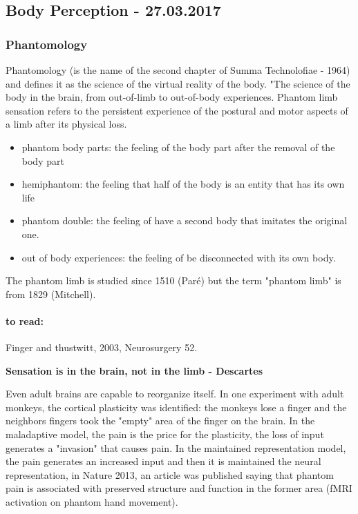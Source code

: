 \documentclass[12pt,article,oneside,a4paper]{memoir}
\begin{document}
\subsection{Body Perception - 27.03.2017}
\subsubsection{Phantomology}
Phantomology (is the name of the second chapter of Summa Technolofiae - 1964) and defines it as the science of the virtual reality of the body.
"The science of the body in the brain, from out-of-limb to out-of-body experiences. 
Phantom  limb  sensation refers to the persistent experience of the postural and motor aspects of a limb after its physical loss.
\begin{itemize}
\item phantom body parts: the feeling of the body part after the removal of the body part
\item hemiphantom: the feeling that half of the body is an entity that has its own life
\item phantom double: the feeling of have a second body that imitates the original one.
\item out of body experiences: the feeling of be disconnected with its own body.
\end{itemize}

The phantom limb is studied since 1510 (Paré) but the term "phantom limb" is from 1829 (Mitchell).

\paragraph{to read:} Finger and thustwitt, 2003, Neurosurgery 52.

\textbf{Sensation is in the brain, not in the limb - Descartes}

Even adult brains are capable to reorganize itself. In one experiment with adult monkeys, the cortical plasticity was identified: the monkeys lose a finger and the neighbors fingers took the "empty" area of the finger on the brain.
In the maladaptive model, the pain is the price for the plasticity, the loss of input generates a "invasion" that causes pain. 
In the maintained representation model, the pain generates an increased input and then it is maintained the neural representation, in Nature 2013, an article was published saying that phantom pain is associated with preserved structure and function in the former area (fMRI activation on phantom hand movement).
\end{document}
